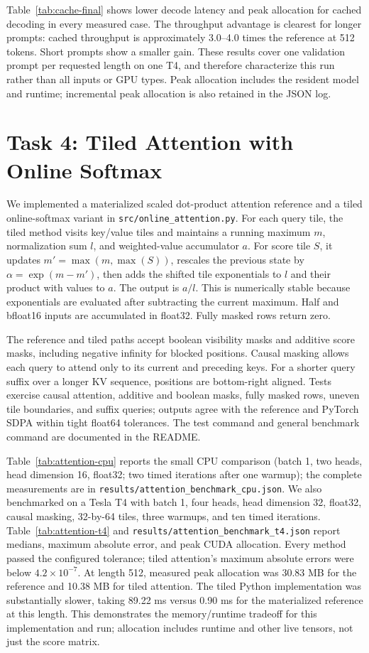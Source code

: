 \documentclass[conference]{IEEEtran}
\begin{document}
Table~\ref{tab:cache-final} shows lower decode latency and peak allocation for cached decoding in every measured case. The throughput advantage is clearest for longer prompts: cached throughput is approximately 3.0--4.0 times the reference at 512 tokens. Short prompts show a smaller gain. These results cover one validation prompt per requested length on one T4, and therefore characterize this run rather than all inputs or GPU types. Peak allocation includes the resident model and runtime; incremental peak allocation is also retained in the JSON log.

\section{Task 4: Tiled Attention with Online Softmax}
\label{sec:tiled-attention}
We implemented a materialized scaled dot-product attention reference and a tiled online-softmax variant in \texttt{src/online\_attention.py}. For each query tile, the tiled method visits key/value tiles and maintains a running maximum $m$, normalization sum $l$, and weighted-value accumulator $a$. For score tile $S$, it updates $m\prime=\max(m,\max(S))$, rescales the previous state by $\alpha=\exp(m-m\prime)$, then adds the shifted tile exponentials to $l$ and their product with values to $a$. The output is $a/l$. This is numerically stable because exponentials are evaluated after subtracting the current maximum. Half and bfloat16 inputs are accumulated in float32. Fully masked rows return zero.

The reference and tiled paths accept boolean visibility masks and additive score masks, including negative infinity for blocked positions. Causal masking allows each query to attend only to its current and preceding keys. For a shorter query suffix over a longer KV sequence, positions are bottom-right aligned. Tests exercise causal attention, additive and boolean masks, fully masked rows, uneven tile boundaries, and suffix queries; outputs agree with the reference and PyTorch SDPA within tight float64 tolerances. The test command and general benchmark command are documented in the README.

Table~\ref{tab:attention-cpu} reports the small CPU comparison (batch 1, two heads, head dimension 16, float32; two timed iterations after one warmup); the complete measurements are in \texttt{results/attention\_benchmark\_cpu.json}. We also benchmarked on a Tesla T4 with batch 1, four heads, head dimension 32, float32, causal masking, 32-by-64 tiles, three warmups, and ten timed iterations. Table~\ref{tab:attention-t4} and \texttt{results/attention\_benchmark\_t4.json} report medians, maximum absolute error, and peak CUDA allocation. Every method passed the configured tolerance; tiled attention's maximum absolute errors were below $4.2\times10^{-7}$. At length 512, measured peak allocation was 30.83 MB for the reference and 10.38 MB for tiled attention. The tiled Python implementation was substantially slower, taking 89.22 ms versus 0.90 ms for the materialized reference at this length. This demonstrates the memory/runtime tradeoff for this implementation and run; allocation includes runtime and other live tensors, not just the score matrix.
\end{document}
